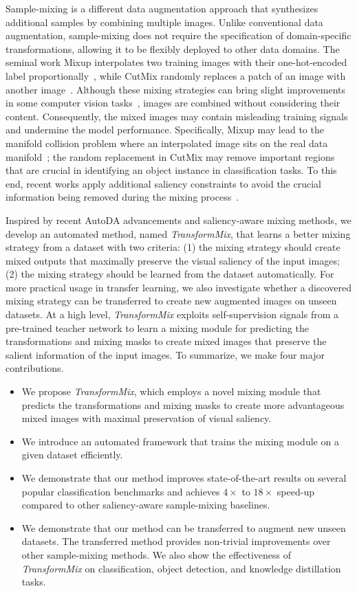 \documentclass[10pt]{article} %
\newcommand{\TMIX}[0]{\textit{TransformMix }}
\newcommand{\TMIXb}[0]{\textit{TransformMix}}
\begin{document}
Sample-mixing is a different data augmentation approach that synthesizes additional samples by combining multiple images. Unlike conventional data augmentation, sample-mixing does not require the specification of domain-specific transformations, allowing it to be flexibly deployed to other data domains. The seminal work Mixup interpolates two training images with their one-hot-encoded label proportionally~\citep{mixup}, while CutMix randomly replaces a patch of an image with another image~\citep{cutmix}. Although these mixing strategies can bring slight improvements in some computer vision tasks~\citep{yolov4}, images are combined without considering their content. Consequently, the mixed images may contain misleading training signals and undermine the model performance. Specifically, Mixup may lead to the manifold collision problem where an interpolated image sits on the real data manifold~\citep{adamixup}; the random replacement in CutMix may remove important regions that are crucial in identifying an object instance in classification tasks. To this end, recent works apply additional saliency constraints to avoid the crucial information being removed during the mixing process~\citep{puzzlemix, supermix, comixup, automix, smix}.

Inspired by recent AutoDA advancements and saliency-aware mixing methods, we develop an automated method, named \TMIXb, that learns a better mixing strategy from a dataset with two criteria: (1) the mixing strategy should create mixed outputs that maximally preserve the visual saliency of the input images; (2) the mixing strategy should be learned from the dataset automatically. For more practical usage in transfer learning, we also investigate whether a discovered mixing strategy can be transferred to create new augmented images on unseen datasets. At a high level, \TMIX exploits self-supervision signals from a pre-trained teacher network to learn a mixing module for predicting the transformations and mixing masks to create mixed images that preserve the salient information of the input images. To summarize, we make four major contributions.

\begin{itemize}
	\item We propose \TMIXb, which employs a novel mixing module that predicts the transformations and mixing masks to create more advantageous mixed images with maximal preservation of visual saliency.
	\item We introduce an automated framework that trains the mixing module on a given dataset efficiently.
	\item We demonstrate that our method improves state-of-the-art results on several popular classification benchmarks and achieves $4\times$ to $18\times$ speed-up compared to other saliency-aware sample-mixing baselines.
	\item We demonstrate that our method can be transferred to augment new unseen datasets. The transferred method provides non-trivial improvements over other sample-mixing methods. We also show the effectiveness of \TMIX on classification, object detection, and knowledge distillation tasks.
\end{itemize}
\end{document}

